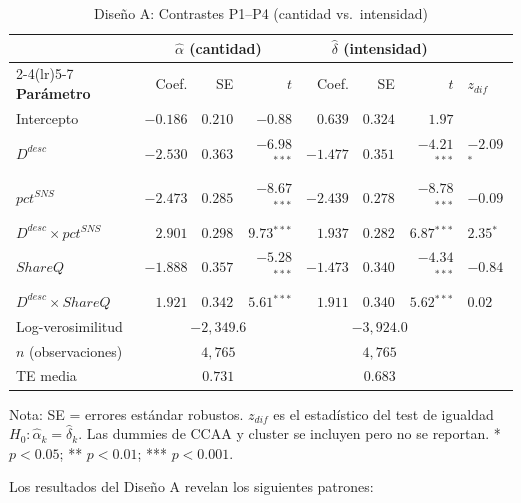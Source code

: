 \documentclass[12pt, a4paper]{article}
\newcommand{\sig}[1]{\ensuremath{^{#1}}}
\begin{document}
\begin{table}[h!]
\centering
\caption{Diseño A: Contrastes P1--P4
(cantidad vs.\ intensidad)}
\label{tab:disA}
\begin{threeparttable}
\begin{tabular}{lrrrrrrl}
\toprule
& \multicolumn{3}{c}{\textbf{$\hat{\alpha}$ (cantidad)}}
& \multicolumn{3}{c}{\textbf{$\hat{\delta}$ (intensidad)}}
& \\
\cmidrule(lr){2-4}\cmidrule(lr){5-7}
\textbf{Parámetro} & Coef. & SE & $t$
  & Coef. & SE & $t$ & \textbf{$z_{dif}$} \\
\midrule
Intercepto
  & $-0.186$ & $0.210$ & $-0.88$
  & $0.639$  & $0.324$ & $1.97$  & \\
$D^{desc}$
  & $-2.530$ & $0.363$ & $-6.98$\sig{***}
  & $-1.477$ & $0.351$ & $-4.21$\sig{***}
  & $-2.09$\sig{*} \\
$pct^{SNS}$
  & $-2.473$ & $0.285$ & $-8.67$\sig{***}
  & $-2.439$ & $0.278$ & $-8.78$\sig{***}
  & $-0.09$ \\
$D^{desc} \times pct^{SNS}$
  & $2.901$  & $0.298$ & $9.73$\sig{***}
  & $1.937$  & $0.282$ & $6.87$\sig{***}
  & $2.35$\sig{*} \\
$ShareQ$
  & $-1.888$ & $0.357$ & $-5.28$\sig{***}
  & $-1.473$ & $0.340$ & $-4.34$\sig{***}
  & $-0.84$ \\
$D^{desc} \times ShareQ$
  & $1.921$  & $0.342$ & $5.61$\sig{***}
  & $1.911$  & $0.340$ & $5.62$\sig{***}
  & $0.02$ \\
\midrule
Log-verosimilitud & \multicolumn{3}{c}{$-2{,}349.6$}
  & \multicolumn{3}{c}{$-3{,}924.0$} & \\
$n$ (observaciones) & \multicolumn{3}{c}{$4{,}765$}
  & \multicolumn{3}{c}{$4{,}765$} & \\
TE media & \multicolumn{3}{c}{$0.731$}
  & \multicolumn{3}{c}{$0.683$} & \\
\bottomrule
\end{tabular}
\begin{tablenotes}
  \small
  \item Nota: SE = errores estándar robustos.
    $z_{dif}$ es el estadístico del test de igualdad
    $H_0: \hat{\alpha}_k = \hat{\delta}_k$. Las dummies
    de CCAA y cluster se incluyen pero no se reportan.
    * $p<0.05$; ** $p<0.01$; *** $p<0.001$.
\end{tablenotes}
\end{threeparttable}
\end{table}

Los resultados del Diseño A revelan los siguientes
patrones:
\end{document}
